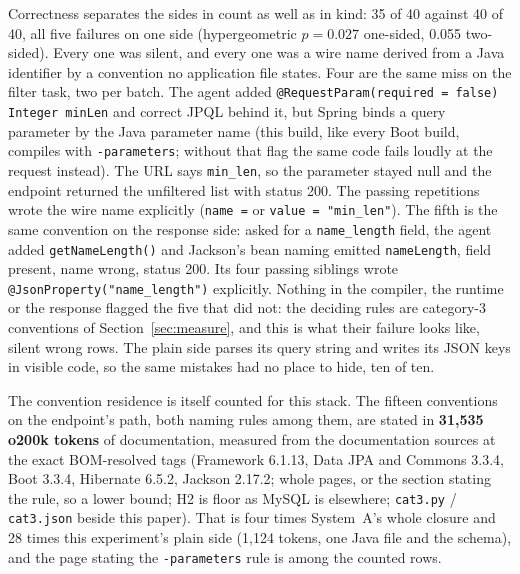 \documentclass[journal]{IEEEtran}
\begin{document}
Correctness separates the sides in count as well as in kind: 35 of 40
against 40 of 40, all five failures on one side (hypergeometric
$p = 0.027$ one-sided, 0.055 two-sided). Every one was silent, and every one was a wire name
derived from a Java identifier by a convention no application file
states. Four are the same miss on the filter task, two per batch. The
agent added \texttt{@RequestParam(required =
false) Integer minLen} and correct JPQL behind it, but Spring binds a
query parameter by the Java parameter name (this build, like every
Boot build, compiles with \texttt{-parameters}; without that flag the
same code fails loudly at the request instead). The URL says
\texttt{min\_len}, so the
parameter stayed null and the endpoint returned the unfiltered list
with status 200. The passing repetitions wrote the wire name
explicitly (\texttt{name =} or \texttt{value = "min\_len"}). The fifth
is the same convention on the response side: asked for a
\texttt{name\_length} field, the agent added
\texttt{getNameLength()} and Jackson's bean naming emitted
\texttt{nameLength}, field present, name wrong, status 200. Its
four passing siblings wrote \texttt{@JsonProperty("name\_length")}
explicitly. Nothing in the
compiler, the runtime or the response flagged the five that did not:
the deciding rules are category-3 conventions of Section~\ref{sec:measure},
and this is what their failure looks like, silent wrong rows. The plain
side parses its query string and writes its JSON keys in visible code,
so the same mistakes had no place to hide, ten of ten.

The convention residence is itself counted for this stack. The fifteen
conventions on the endpoint's path, both naming rules among them, are
stated in \textbf{31,535 o200k tokens} of documentation, measured from
the documentation sources at the exact BOM-resolved tags (Framework
6.1.13, Data JPA and Commons 3.3.4, Boot 3.3.4, Hibernate 6.5.2,
Jackson 2.17.2; whole pages, or the section stating the rule, so a
lower bound; H2 is floor as MySQL is elsewhere; \texttt{cat3.py} /
\texttt{cat3.json} beside this paper). That is four times System~A's
whole closure and 28 times this experiment's plain side (1,124 tokens,
one Java file and the schema), and the page stating the
\texttt{-parameters} rule is among the counted rows.
\end{document}

